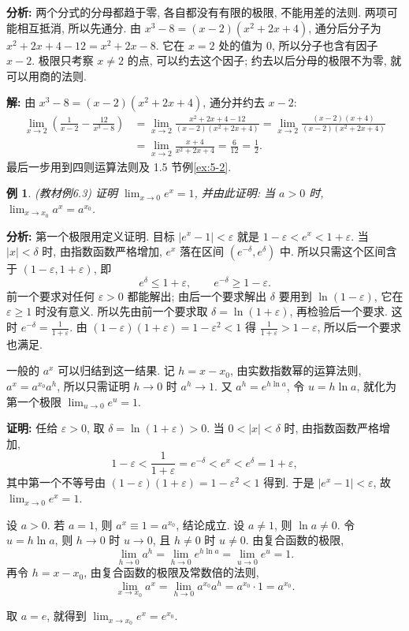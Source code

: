 \documentclass[UTF8,openany]{ctexbook}
\theoremstyle{chinesetextbook}
\newtheorem{example}{例}[section]
\newenvironment{cnproof}{\par\indent\textbf{证明:} \ignorespaces}{\par}
\newenvironment{cnsolution}{\par\indent\textbf{解:} \ignorespaces}{\par}
\begin{document}
\par\indent\textbf{分析:} 两个分式的分母都趋于零, 各自都没有有限的极限, 不能用差的法则. 两项可能相互抵消, 所以先通分. 由 $x^3-8=(x-2)(x^2+2x+4)$, 通分后分子为 $x^2+2x+4-12=x^2+2x-8$. 它在 $x=2$ 处的值为 $0$, 所以分子也含有因子 $x-2$. 极限只考察 $x\ne2$ 的点, 可以约去这个因子; 约去以后分母的极限不为零, 就可以用商的法则.
\begin{cnsolution}
由 $x^3-8=(x-2)(x^2+2x+4)$, 通分并约去 $x-2$:
\[
\begin{aligned}
\lim_{x\to2}\left(\frac1{x-2}-\frac{12}{x^3-8}\right)
&=\lim_{x\to2}\frac{x^2+2x+4-12}{(x-2)(x^2+2x+4)}=\lim_{x\to2}\frac{(x-2)(x+4)}{(x-2)(x^2+2x+4)}\\
&=\lim_{x\to2}\frac{x+4}{x^2+2x+4}=\frac6{12}=\frac12.
\end{aligned}
\]
最后一步用到四则运算法则及 1.5 节例\ref{ex:5-2}.
\end{cnsolution}
\begin{example}\label{ex:6-3}
\textnormal{(教材例6.3)} 证明 $\displaystyle\lim_{x\to0}e^x=1$, 并由此证明: 当 $a>0$ 时, $\displaystyle\lim_{x\to x_0}a^x=a^{x_0}$.
\end{example}
\par\indent\textbf{分析:} 第一个极限用定义证明. 目标 $|e^x-1|<\varepsilon$ 就是 $1-\varepsilon<e^x<1+\varepsilon$. 当 $|x|<\delta$ 时, 由指数函数严格增加, $e^x$ 落在区间 $(e^{-\delta},e^\delta)$ 中. 所以只需这个区间含于 $(1-\varepsilon,1+\varepsilon)$, 即
\[
e^\delta\le1+\varepsilon,\qquad e^{-\delta}\ge1-\varepsilon.
\]
前一个要求对任何 $\varepsilon>0$ 都能解出; 由后一个要求解出 $\delta$ 要用到 $\ln(1-\varepsilon)$, 它在 $\varepsilon\ge1$ 时没有意义. 所以先由前一个要求取 $\delta=\ln(1+\varepsilon)$, 再检验后一个要求. 这时 $\displaystyle e^{-\delta}=\frac1{1+\varepsilon}$. 由 $(1-\varepsilon)(1+\varepsilon)=1-\varepsilon^2<1$ 得 $\displaystyle\frac1{1+\varepsilon}>1-\varepsilon$, 所以后一个要求也满足.

一般的 $a^x$ 可以归结到这一结果. 记 $h=x-x_0$, 由实数指数幂的运算法则, $a^x=a^{x_0}a^h$, 所以只需证明 $h\to0$ 时 $a^h\to1$. 又 $a^h=e^{h\ln a}$, 令 $u=h\ln a$, 就化为第一个极限 $\displaystyle\lim_{u\to0}e^u=1$.
\begin{cnproof}
任给 $\varepsilon>0$, 取 $\delta=\ln(1+\varepsilon)>0$. 当 $0<|x|<\delta$ 时, 由指数函数严格增加,
\[
1-\varepsilon<\frac1{1+\varepsilon}=e^{-\delta}<e^x<e^\delta=1+\varepsilon,
\]
其中第一个不等号由 $(1-\varepsilon)(1+\varepsilon)=1-\varepsilon^2<1$ 得到. 于是 $|e^x-1|<\varepsilon$, 故 $\displaystyle\lim_{x\to0}e^x=1$.

设 $a>0$. 若 $a=1$, 则 $a^x\equiv1=a^{x_0}$, 结论成立. 设 $a\ne1$, 则 $\ln a\ne0$. 令 $u=h\ln a$, 则 $h\to0$ 时 $u\to0$, 且 $h\ne0$ 时 $u\ne0$. 由复合函数的极限,
\[
\lim_{h\to0}a^h=\lim_{h\to0}e^{h\ln a}=\lim_{u\to0}e^u=1.
\]
再令 $h=x-x_0$, 由复合函数的极限及常数倍的法则,
\[
\lim_{x\to x_0}a^x=\lim_{h\to0}a^{x_0}a^h=a^{x_0}\cdot1=a^{x_0}.
\]
\end{cnproof}
取 $a=e$, 就得到 $\displaystyle\lim_{x\to x_0}e^x=e^{x_0}$.
\end{document}
